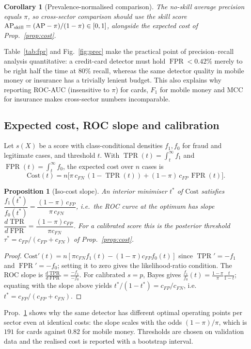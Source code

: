 \documentclass[journal]{IEEEtran}
\newtheorem{proposition}{Proposition}
\newtheorem{corollary}{Corollary}
\newcommand{\1}{\mathbf{1}}
\DeclareMathOperator{\TPR}{TPR}
\DeclareMathOperator{\FPR}{FPR}
\begin{document}
\begin{corollary}[Prevalence-normalised comparison]
The no-skill average precision equals $\pi$, so cross-sector comparison should use the skill score $\mathrm{AP}_{\rm skill}=(\mathrm{AP}-\pi)/(1-\pi)\in[0,1]$, alongside the expected cost of Prop.~\ref{prop:cost}.
\end{corollary}
Table~\ref{tab:fpr} and Fig.~\ref{fig:prec} make the practical point of precision--recall analysis \cite{saito2015pr} quantitative: a credit-card detector must hold $\FPR<0.42\%$ merely to be right half the time at $80\%$ recall, whereas the same detector quality in mobile money or insurance has a trivially lenient budget. This also explains why reporting ROC-AUC (insensitive to $\pi$) for cards, $F_1$ for mobile money and MCC for insurance makes cross-sector numbers incomparable.


\subsection{Expected cost, ROC slope and calibration}\label{sec:costroc}
Let $s(X)$ be a score with class-conditional densities $f_1,f_0$ for fraud and legitimate cases, and threshold $t$. With $\TPR(t)=\int_t^\infty f_1$ and $\FPR(t)=\int_t^\infty f_0$, the expected cost over $n$ cases is
\begin{equation}
\mathrm{Cost}(t)=n\big[\pi\,c_{FN}\,(1-\TPR(t))+(1-\pi)\,c_{FP}\,\FPR(t)\big].
\end{equation}
\begin{proposition}[Iso-cost slope]\label{prop:isocost}
An interior minimiser $t^\ast$ of $\mathrm{Cost}$ satisfies $\dfrac{f_1(t^\ast)}{f_0(t^\ast)}=\dfrac{(1-\pi)\,c_{FP}}{\pi\,c_{FN}}$, i.e.\ the ROC curve at the optimum has slope $\dfrac{d\TPR}{d\FPR}=\dfrac{(1-\pi)c_{FP}}{\pi c_{FN}}$. For a calibrated score this is the posterior threshold $\tau^\ast=c_{FP}/(c_{FP}+c_{FN})$ of Prop.~\ref{prop:cost}.
\end{proposition}
\begin{proof}
$\mathrm{Cost}'(t)=n[\pi c_{FN}f_1(t)-(1-\pi)c_{FP}f_0(t)]$ since $\TPR'=-f_1$ and $\FPR'=-f_0$; setting it to zero gives the likelihood-ratio condition. The ROC slope is $\tfrac{d\TPR}{d\FPR}=\tfrac{-f_1}{-f_0}$. For calibrated $s=p$, Bayes gives $\tfrac{f_1}{f_0}(t)=\tfrac{1-\pi}{\pi}\tfrac{t}{1-t}$; equating with the slope above yields $t^\ast/(1-t^\ast)=c_{FP}/c_{FN}$, i.e.\ $t^\ast=c_{FP}/(c_{FP}+c_{FN})$. \end{proof}
\noindent Prop.~\ref{prop:isocost} shows why the same detector has different optimal operating points per sector even at identical costs: the slope scales with the odds $(1-\pi)/\pi$, which is $191$ for cards against $0.82$ for mobile money. Thresholds are chosen on validation data and the realised cost is reported with a bootstrap interval.
\end{document}
